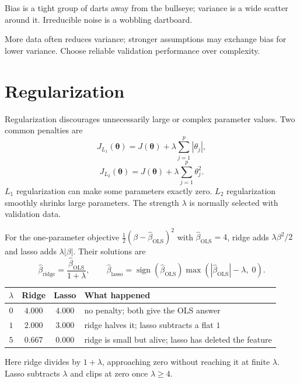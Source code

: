 \begin{intuition}
Bias is a tight group of darts away from the bullseye; variance is a wide scatter around it. Irreducible noise is a wobbling dartboard.
\end{intuition}

More data often reduces variance; stronger assumptions may exchange bias for lower variance. Choose reliable validation performance over complexity.

\section{Regularization}

Regularization discourages unnecessarily large or complex parameter values. Two common penalties are
\[
  J_{L_1}(\bm{\theta})=J(\bm{\theta})
  +\lambda\sum_{j=1}^{p}|\theta_j|,
\]
\[
  J_{L_2}(\bm{\theta})=J(\bm{\theta})
  +\lambda\sum_{j=1}^{p}\theta_j^2.
\]
$L_1$ regularization can make some parameters exactly zero. $L_2$ regularization smoothly shrinks large parameters. The strength $\lambda$ is normally selected with validation data.

\begin{workedexample}
For the one-parameter objective $\tfrac12(\beta-\hat\beta_{\text{OLS}})^2$ with $\hat\beta_{\text{OLS}}=4$, ridge adds $\lambda\beta^2/2$ and lasso adds $\lambda|\beta|$. Their solutions are
\[
  \hat{\beta}_{\text{ridge}}=\frac{\hat{\beta}_{\text{OLS}}}{1+\lambda},
  \qquad
  \hat{\beta}_{\text{lasso}}=\operatorname{sign}(\hat{\beta}_{\text{OLS}})\max\!\left(|\hat{\beta}_{\text{OLS}}|-\lambda,\;0\right).
\]

\begin{mltable}\small
\begin{tabular}{cccl}
\toprule
\rowcolor{MLPaleBlue!92}
$\lambda$ & Ridge & Lasso & What happened \\
\midrule
$0$ & $4.000$ & $4.000$ & no penalty; both give the OLS answer \\
$1$ & $2.000$ & $3.000$ & ridge halves it; lasso subtracts a flat $1$ \\
$5$ & $0.667$ & $0.000$ & ridge is small but alive; lasso has deleted the feature \\
\bottomrule
\end{tabular}
\end{mltable}

Here ridge divides by $1+\lambda$, approaching zero without reaching it at finite $\lambda$. Lasso subtracts $\lambda$ and clips at zero once $\lambda\ge4$.
\end{workedexample}

